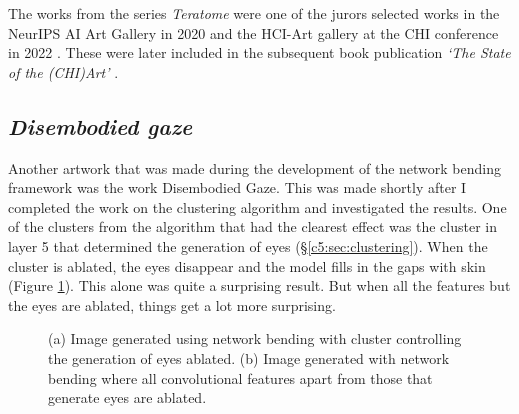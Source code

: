 The works from the series \textit{Teratome} were one of the jurors selected works in the NeurIPS AI Art Gallery in 2020 \citep{broad2020teratome} and the HCI-Art gallery at the CHI conference in 2022 \citep{perry2022art}. 
These were later included in the subsequent book publication \textit{`The State of the (CHI)Art'} \citep{sturdee2023chiart}. 

\subsection{\textit{Disembodied gaze}}
\label{c7:subsubsec:disembodied}

Another artwork that was made during the development of the network bending framework was the work Disembodied Gaze. 
This was made shortly after I completed the work on the clustering algorithm and investigated the results. 
One of the clusters from the algorithm that had the clearest effect was the cluster in layer 5 that determined the generation of eyes (\S \ref{c5:sec:clustering}). 
When the cluster is ablated, the eyes disappear and the model fills in the gaps with skin (Figure \ref{fig:c7:eyes-no-eyes}). 
This alone was quite a surprising result. But when all the features but the eyes are ablated, things get a lot more surprising. 

\begin{figure}[!htbp]
    \hfill
    \hfill
    \caption[Network bending eye cluster comparison]{(a) Image generated using network bending with cluster controlling the generation of eyes ablated. (b) Image generated with network bending where all convolutional features apart from those that generate eyes are ablated.}
    \label{fig:c7:eyes-no-eyes}
 \end{figure}

